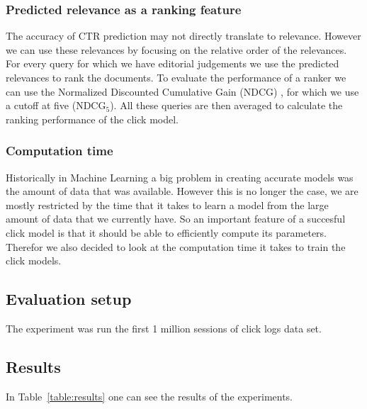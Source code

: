 \subsubsection{Predicted relevance as a ranking feature}
The accuracy of CTR prediction may not directly translate to relevance. However we can use these relevances by focusing on the relative order of the relevances. For every query for which we have editorial judgements we use the predicted relevances to rank the documents. To evaluate the performance of a ranker we can use the Normalized Discounted Cumulative Gain (NDCG) \cite{NDCG}, for which we use a cutoff at five (NDCG$_5$). All these queries are then averaged to calculate the ranking performance of the click model.

\subsubsection{Computation time}
Historically in Machine Learning a big problem in creating accurate models was the amount of data that was available. However this is no longer the case, we are mostly restricted by the time that it takes to learn a model from the large amount of data that we currently have. So an important feature of a succesful click model is that it should be able to efficiently compute its parameters. Therefor we also decided to look at the computation time it takes to train the click models.

\subsection{Evaluation setup}
The experiment was run the first 1 million sessions of click logs data set.


\subsection{Results}
In Table~\ref{table:results} one can see the results of the experiments.

